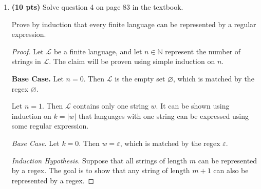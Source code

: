 \documentclass[11pt]{article}
\begin{document}
\begin{enumerate}[label=\textbf{Q\arabic*.}]
\begin{enumerate}[label=\textit{\alph*)}]
\begin{proof}
	\medskip

	\textbf{Induction Step.} Choosing the transition \(q_0 \xrightarrow{1}q_1\), the two cases from the base case apply in the same way. The only difference is that in case 2, there are more 1's to be read. However, the index \(i_j\) of those 1's is an element of \(A\) and \(l < j\), so it is covered by the induction hypothesis.

	If the transition \(q_0 \xrightarrow{1}q_0\) is always taken, \(w\) can never be accepted. On the other hand, if the transition \(q_0 \xrightarrow{1}q_1\) is taken for some \(w(i_j)\), then \(w\) is rejected by the induction hypothesis.

	By the principle of complete induction, it can be concluded that there is no path where \(\mathcal{N}\) accepts \(w \notin L\).

	Therefore, the NFA \(\mathcal{N}\) correctly accepts \(L\), completing the proof.
	\medbreak
\end{proof}

\item \textbf{(3 pts)} \textit{Bonus}: The smallest DFA that accepts $L$ has to have exactly $2^{k+1}-1$ number of states.
lol
\end{enumerate}

\item \textbf{(10 pts)} Solve question 4 on page 83 in the textbook.

Prove by induction that every finite language can be represented by a regular expression.
\begin{proof}
	Let \(\mathcal{L}\) be a finite language, and let \(n \in \mathbb{N}\) represent the number of strings in \(\mathcal{L}\). The claim will be proven using simple induction on \(n\).

	\textbf{Base Case.} Let \(n = 0\). Then \(\mathcal{L}\) is the empty set \(\varnothing\), which is matched by the regex \(\varnothing\).

	Let \(n=1\). Then \(\mathcal{L}\) contains only one string \(w\). It can be shown using induction on \(k=|w|\) that languages with one string can be expressed using some regular expression.

	\textit{Base Case.} Let \(k=0\). Then \(w = \varepsilon\), which is matched by the regex \(\varepsilon\).

	\textit{Induction Hypothesis.} Suppose that all strings of length \(m\) can be represented by a regex. The goal is to show that any string of length \(m+1\) can also be represented by a regex.


\end{proof}
\end{enumerate}
\end{document}

